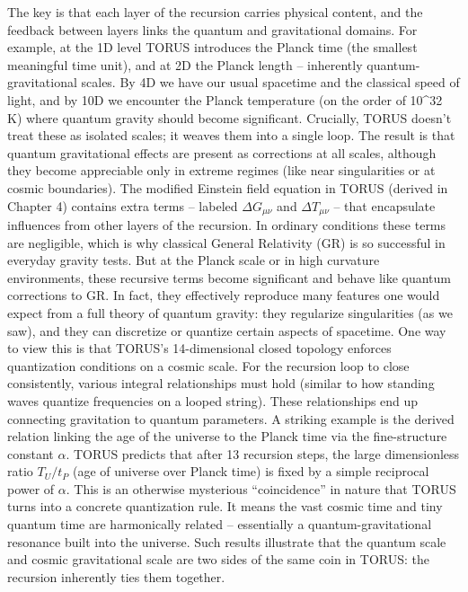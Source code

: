 \documentclass[]{article}
\begin{document}
The key is that each layer of the recursion carries physical content,
and the feedback between layers links the quantum and gravitational
domains. For example, at the 1D level TORUS introduces the Planck time
(the smallest meaningful time unit), and at 2D the Planck length --
inherently quantum-gravitational scales. By 4D we have our usual
spacetime and the classical speed of light, and by 10D we encounter the
Planck temperature (on the order of 10\^{}32 K) where quantum gravity
should become significant. Crucially, TORUS doesn't treat these as
isolated scales; it weaves them into a single loop. The result is that
quantum gravitational effects are present as corrections at all scales,
although they become appreciable only in extreme regimes (like near
singularities or at cosmic boundaries). The modified Einstein field
equation in TORUS (derived in Chapter 4) contains extra terms -- labeled
$\Delta G_{\mu\nu}$ and $\Delta T_{\mu\nu}$ -- that encapsulate influences from other layers of
the recursion. In ordinary conditions these terms are negligible, which
is why classical General Relativity (GR) is so successful in everyday
gravity tests. But at the Planck scale or in high curvature
environments, these recursive terms become significant and behave like
quantum corrections to GR. In fact, they effectively reproduce many
features one would expect from a full theory of quantum gravity: they
regularize singularities (as we saw), and they can discretize or
quantize certain aspects of spacetime. One way to view this is that
TORUS's 14-dimensional closed topology enforces quantization conditions
on a cosmic scale. For the recursion loop to close consistently, various
integral relationships must hold (similar to how standing waves quantize
frequencies on a looped string). These relationships end up connecting
gravitation to quantum parameters. A striking example is the derived
relation linking the age of the universe to the Planck time via the
fine-structure constant $\alpha$. TORUS predicts that after 13 recursion steps,
the large dimensionless ratio $T_U/t_P$ (age of universe over Planck
time) is fixed by a simple reciprocal power of $\alpha$. This is an otherwise
mysterious ``coincidence'' in nature that TORUS turns into a concrete
quantization rule. It means the vast cosmic time and tiny quantum time
are harmonically related -- essentially a quantum-gravitational
resonance built into the universe. Such results illustrate that the
quantum scale and cosmic gravitational scale are two sides of the same
coin in TORUS: the recursion inherently ties them together.
\end{document}
